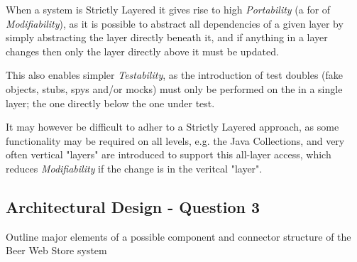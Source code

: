 When a system is Strictly Layered it gives rise to high \emph{Portability} (a for of \emph{Modifiability}), as it is possible to abstract all dependencies of a given layer by simply abstracting the layer directly beneath it, and if anything in a layer changes then only the layer directly above it must be updated.

This also enables simpler \emph{Testability}, as the introduction of test doubles (fake objects, stubs, spys and/or mocks) must only be performed on the in a single layer; the one directly below the one under test.

It may however be difficult to adher to a Strictly Layered approach, as some functionality may be required on all levels, e.g. the Java Collections, and very often vertical "layers" are introduced to support this all-layer access, which reduces \emph{Modifiability} if the change is in the veritcal "layer".

\subsection{Architectural Design - Question 3}

\begin{question}
Outline major elements of a possible component and connector
structure of the Beer Web Store system
\end{question}


